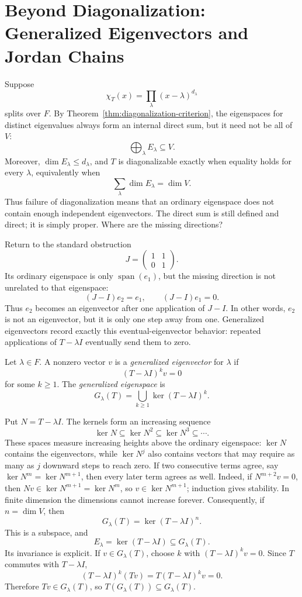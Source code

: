 \section{Beyond Diagonalization: Generalized Eigenvectors and Jordan Chains}
\label{sec:generalized-eigenvectors-jordan-chains}

Suppose
\[
\chi_T(x)=\prod_\lambda(x-\lambda)^{d_\lambda}
\]
splits over \(F\). By Theorem~\ref{thm:diagonalization-criterion}, the eigenspaces for
distinct eigenvalues always form an internal direct sum, but it need not be
all of \(V\):
\[
\bigoplus_\lambda E_\lambda\subseteq V.
\]
Moreover, \(\dim E_\lambda\leq d_\lambda\), and \(T\) is diagonalizable
exactly when equality holds for every \(\lambda\), equivalently when
\[
\sum_\lambda\dim E_\lambda=\dim V.
\]
Thus failure of diagonalization means
that an ordinary eigenspace does not contain enough independent eigenvectors.
The direct sum is still defined and direct; it is simply proper. Where are
the missing directions?

Return to the standard obstruction
\[
J=\begin{pmatrix}1&1\\0&1\end{pmatrix}.
\]
Its ordinary eigenspace is only \(\operatorname{span}(e_1)\), but the
missing direction is not unrelated to that eigenspace:
\[
(J-I)e_2=e_1,\qquad (J-I)e_1=0.
\]
Thus \(e_2\) becomes an eigenvector after one application of \(J-I\).
In other words, \(e_2\) is not an eigenvector, but it is only one step away
from one. Generalized eigenvectors record exactly this eventual-eigenvector
behavior: repeated applications of \(T-\lambda I\) eventually send them to
zero.

\begin{definition}
Let \(\lambda\in F\).  A nonzero vector \(v\) is a
\emph{generalized eigenvector} for \(\lambda\) if
\[
(T-\lambda I)^kv=0
\]
for some \(k\geq1\).  The \emph{generalized eigenspace} is
\[
G_\lambda(T)=\bigcup_{k\geq1}\ker(T-\lambda I)^k.
\]
\end{definition}

Put \(N=T-\lambda I\).  The kernels form an increasing sequence
\[
\ker N\subseteq\ker N^2\subseteq\ker N^3\subseteq\cdots.
\]
These spaces measure increasing heights above the ordinary eigenspace:
\(\ker N\) contains the eigenvectors, while \(\ker N^j\) also contains
vectors that may require as many as \(j\) downward steps to reach zero.
If two consecutive terms agree, say \(\ker N^m=\ker N^{m+1}\), then every
later term agrees as well.  Indeed, if \(N^{m+2}v=0\), then
\(Nv\in\ker N^{m+1}=\ker N^m\), so \(v\in\ker N^{m+1}\); induction gives
stability.  In finite dimension the dimensions cannot increase forever.
Consequently, if \(n=\dim V\), then
\[
G_\lambda(T)=\ker(T-\lambda I)^n.
\]
This is a subspace, and
\[
E_\lambda=\ker(T-\lambda I)\subseteq G_\lambda(T).
\]
Its invariance is explicit. If \(v\in G_\lambda(T)\), choose \(k\) with
\((T-\lambda I)^kv=0\). Since \(T\) commutes with \(T-\lambda I\),
\[
(T-\lambda I)^k(Tv)=T(T-\lambda I)^kv=0.
\]
Therefore \(Tv\in G_\lambda(T)\), so
\(T(G_\lambda(T))\subseteq G_\lambda(T)\).

